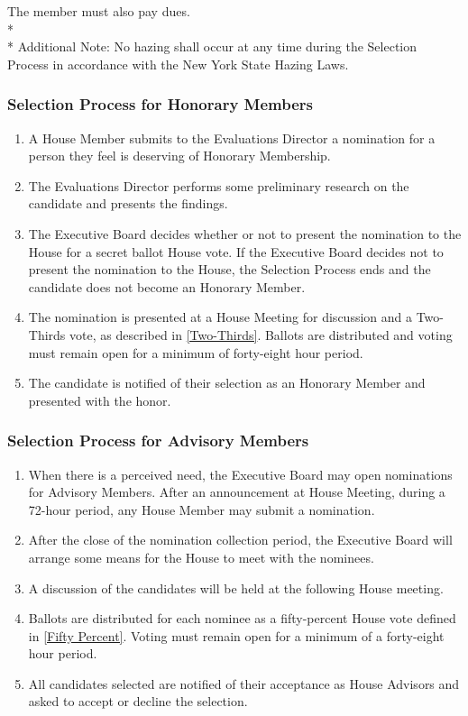 \documentclass{article}
\newcommand{\bsubsection}[1]{\subsubsection{#1} \label{#1}}
\begin{document}
The member must also pay dues.
\\* \\*
Additional Note: No hazing shall occur at any time during the Selection Process in accordance with the New York State Hazing Laws.
\bsubsection{Selection Process for Honorary Members}
\begin{enumerate}
	\item A House Member submits to the Evaluations Director a nomination for a person they feel is deserving of Honorary Membership.
	\item The Evaluations Director performs some preliminary research on the candidate and presents the findings.
	\item The Executive Board decides whether or not to present the nomination to the House for a secret ballot House vote.
		If the Executive Board decides not to present the nomination to the House, the Selection Process ends and the candidate does not become an Honorary Member.
	\item The nomination is presented at a House Meeting for discussion and a Two-Thirds vote, as described in \ref{Two-Thirds}.
		Ballots are distributed and voting must remain open for a minimum of forty-eight hour period.
	\item The candidate is notified of their selection as an Honorary Member and presented with the honor.
\end{enumerate}
\bsubsection{Selection Process for Advisory Members}
\begin{enumerate}
	\item When there is a perceived need, the Executive Board may open nominations for Advisory Members.
		After an announcement at House Meeting, during a 72-hour period, any House Member may submit a nomination.
	\item After the close of the nomination collection period, the Executive Board will arrange some means for the House to meet with the nominees.
	\item A discussion of the candidates will be held at the following House meeting.
	\item Ballots are distributed for each nominee as a fifty-percent House vote defined in \ref{Fifty Percent}.
		Voting must remain open for a minimum of a forty-eight hour period.
	\item All candidates selected are notified of their acceptance as House Advisors and asked to accept or decline the selection.
\end{enumerate}
\end{document}
